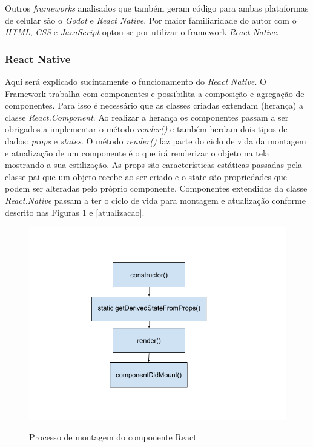 Outros \textit{frameworks} analisados que também geram código para ambas plataformas de celular são o \textit{Godot} e \textit{React Native}. Por maior familiaridade do autor com o \textit{HTML}, \textit{CSS} e \textit{JavaScript} optou-se por utilizar o framework \textit{React Native}.

\subsubsection[React Native]{React Native}
Aqui será explicado sucintamente o funcionamento do \textit{React Native}. O Framework trabalha com componentes e possibilita a composição e agregação de componentes. Para isso é necessário que as classes criadas extendam (herança) a classe \textit{React.Component}. Ao realizar a herança os componentes passam a ser obrigados a implementar o método \textit{render()} e também herdam dois tipos de dados: \textit{props} e \textit{states}. O método \textit{render()} faz parte do ciclo de vida da montagem e atualização de um componente é o que irá renderizar o objeto na tela mostrando a sua estilização. As props são características estáticas passadas pela classe pai que um objeto recebe ao ser criado e o state são propriedades que podem ser alteradas pelo próprio componente. Componentes extendidos da classe \textit{React.Native} passam a ter o ciclo de vida para montagem e atualização conforme descrito nas Figuras \ref{montagem} e \ref{atualizacao}.


\begin{figure}[H]
\centering
\caption{Processo de montagem do componente React}
\includegraphics[scale=0.4]{figuras/montagem.png}
\label{montagem}
\end{figure}


